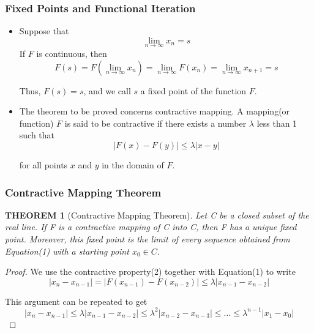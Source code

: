 \documentclass[notheorems,mathserif,table,compress]{beamer}  %
\begin{document}
\begin{frame}
\frametitle{Fixed Points and Functional Iteration}
\begin{itemize}
\item Suppose that
\begin{displaymath}
\lim_{n \to \infty}x_n=s
\end{displaymath}
 If $F$ is continuous, then 
\begin{displaymath}
F(s)=F(\lim_{n \to \infty}x_n)=\lim_{n\to\infty}F(x_n)=\lim_{n\to\infty}x_{n+1}=s
\end{displaymath}

Thus, $F(s)=s$, and we call $s$ a fixed point of the function $F$.
\end{itemize}
\begin{itemize}
\item The theorem to be proved concerns \textsf{contractive mapping}. A mapping(or function) $F$ is said to be \textsf{contractive} if there exists a number $\lambda$ less than 1 such that
\begin{equation}
|F(x)-F(y)|\leq \lambda|x-y|
\end{equation}

for all points $x$ and $y$ in the domain of $F$.
\end{itemize}
\end{frame}

\begin{frame}
\frametitle{Contractive Mapping Theorem}
\theoremstyle{plain}
\newtheorem{theorem}{THEOREM}
\begin{theorem}[Contractive Mapping Theorem]
Let C be a closed subset of the real line. If F is a contractive mapping of C into C, then F has a unique fixed point. Moreover, this fixed point is the limit of every sequence obtained from Equation(1) with a starting point $x_0\in C$.
\end{theorem}

\begin{proof}
We use the contractive property(2) together with Equation(1) to write
\begin{displaymath}
|x_n-x_{n-1}|=|F(x_{n-1})-F(x_{n-2})|\leq\lambda|x_{n-1}-x_{n-2}|
\end{displaymath}

This argument can be repeated to get
\begin{displaymath}
|x_n-x_{n-1}|\leq\lambda|x_{n-1}-x_{n-2}|\leq{\lambda}^2|x_{n-2}-x_{n-3}|\leq\ldots\leq{\lambda}^{n-1}|x_1-x_0|
\end{displaymath}

\end{proof}
\end{frame}
\end{document}
